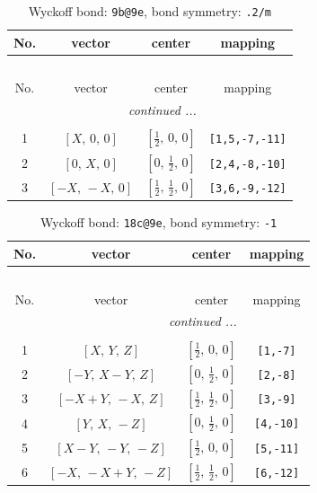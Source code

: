 \documentclass[fleqn,8pt]{jsarticle}
\begin{document}
\renewcommand{\arraystretch}{1.2}
\begin{longtable}{cccc}
\caption{Wyckoff bond: {\tt 9b@9e}, bond symmetry: {\tt .2/m}}
 \\
 \hline \hline
No. & vector & center & mapping \\ \hline \endfirsthead

\multicolumn{3}{l}{\tablename\ \thetable{}} \\
 \hline \hline
No. & vector & center & mapping \\ \hline \endhead

 \hline \hline
\multicolumn{3}{r}{\footnotesize\it continued ...} \\ \endfoot

 \hline \hline
\multicolumn{3}{r}{} \\ \endlastfoot

1 & $\left[ X,\, 0,\, 0 \right]$ & $\left[ \frac{1}{2},\, 0,\, 0 \right]$ & {\tt [1,5,-7,-11]} \\ \hline
2 & $\left[ 0,\, X,\, 0 \right]$ & $\left[ 0,\, \frac{1}{2},\, 0 \right]$ & {\tt [2,4,-8,-10]} \\ \hline
3 & $\left[ - X,\, - X,\, 0 \right]$ & $\left[ \frac{1}{2},\, \frac{1}{2},\, 0 \right]$ & {\tt [3,6,-9,-12]} \\
\end{longtable}
\renewcommand{\arraystretch}{1.2}
\begin{longtable}{cccc}
\caption{Wyckoff bond: {\tt 18c@9e}, bond symmetry: {\tt -1}}
 \\
 \hline \hline
No. & vector & center & mapping \\ \hline \endfirsthead

\multicolumn{3}{l}{\tablename\ \thetable{}} \\
 \hline \hline
No. & vector & center & mapping \\ \hline \endhead

 \hline \hline
\multicolumn{3}{r}{\footnotesize\it continued ...} \\ \endfoot

 \hline \hline
\multicolumn{3}{r}{} \\ \endlastfoot

1 & $\left[ X,\, Y,\, Z \right]$ & $\left[ \frac{1}{2},\, 0,\, 0 \right]$ & {\tt [1,-7]} \\ \hline
2 & $\left[ - Y,\, X - Y,\, Z \right]$ & $\left[ 0,\, \frac{1}{2},\, 0 \right]$ & {\tt [2,-8]} \\ \hline
3 & $\left[ - X + Y,\, - X,\, Z \right]$ & $\left[ \frac{1}{2},\, \frac{1}{2},\, 0 \right]$ & {\tt [3,-9]} \\ \hline
4 & $\left[ Y,\, X,\, - Z \right]$ & $\left[ 0,\, \frac{1}{2},\, 0 \right]$ & {\tt [4,-10]} \\ \hline
5 & $\left[ X - Y,\, - Y,\, - Z \right]$ & $\left[ \frac{1}{2},\, 0,\, 0 \right]$ & {\tt [5,-11]} \\ \hline
6 & $\left[ - X,\, - X + Y,\, - Z \right]$ & $\left[ \frac{1}{2},\, \frac{1}{2},\, 0 \right]$ & {\tt [6,-12]} \\
\end{longtable}
\end{document}
